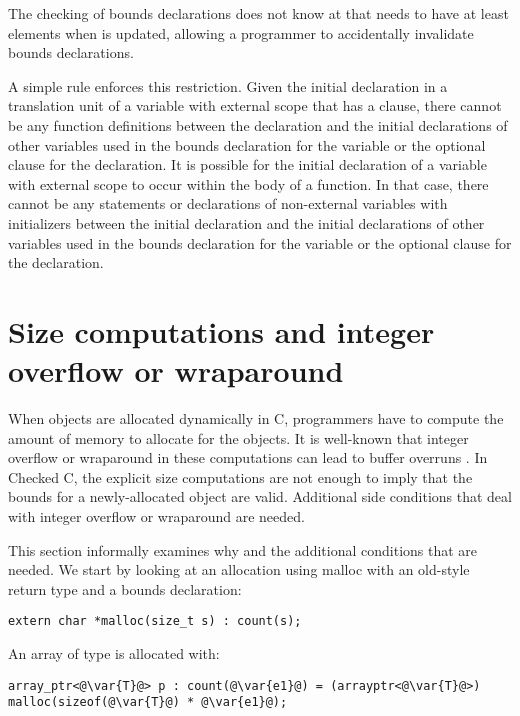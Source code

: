 The checking of bounds declarations does not know at
 that  needs to have at least 
elements when  is updated, allowing a programmer to accidentally
invalidate bounds declarations.

A simple rule enforces this restriction. Given the initial declaration
in a translation unit of a variable with external scope that has a
 clause, there cannot be any function definitions between
the declaration and the initial declarations of other variables used in
the bounds declaration for the variable or the optional  clause for the declaration.
It is possible for the initial declaration of
a variable with external scope to occur within the body of a function.
In that case, there cannot be any statements or declarations of
non-external variables with initializers between the initial declaration
and the initial declarations of other variables used in the
bounds declaration for the variable or the optional  clause for
the declaration.

\section{Size computations and integer overflow or wraparound}
\label{section:integer-overflow-informal}

When objects are allocated dynamically in C, programmers have to compute
the amount of memory to allocate for the objects. It is well-known 
that integer overflow or wraparound in these computations can lead to buffer
overruns \cite{Howard2003,Mitre2015-128,Mitre2015-190,Mitre2015-680,Dietz2015}.
 In Checked C, the explicit size computations are not enough
to imply that the bounds for a newly-allocated object are valid.
Additional side conditions that deal with integer overflow or wraparound
are needed.

This section informally examines why and the additional conditions that
are needed. We start by looking at an allocation using malloc with an
old-style  return type and a bounds declaration:

\begin{lstlisting}
extern char *malloc(size_t s) : count(s);
\end{lstlisting}

An array of type  is allocated with:

\begin{lstlisting}[escapechar=\@]
array_ptr<@\var{T}@> p : count(@\var{e1}@) = (arrayptr<@\var{T}@>) malloc(sizeof(@\var{T}@) * @\var{e1}@);
\end{lstlisting}

